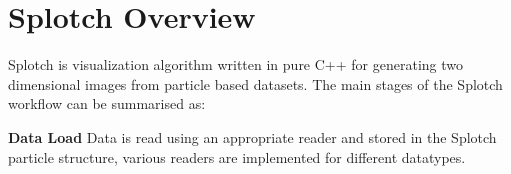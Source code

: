 \documentclass[runningheads,a4paper]{llncs}
\begin{document}


\section{Splotch Overview}
\label{sect:overview}


Splotch is visualization algorithm written in pure C++ for generating two dimensional images from particle based datasets. 
The main stages of the Splotch workflow can be summarised as:

\vskip 1pc
\noindent
\textbf{Data Load}
  Data is read using an appropriate reader and stored in the Splotch particle structure, various readers are 
  implemented for different datatypes.
  
\end{document}
